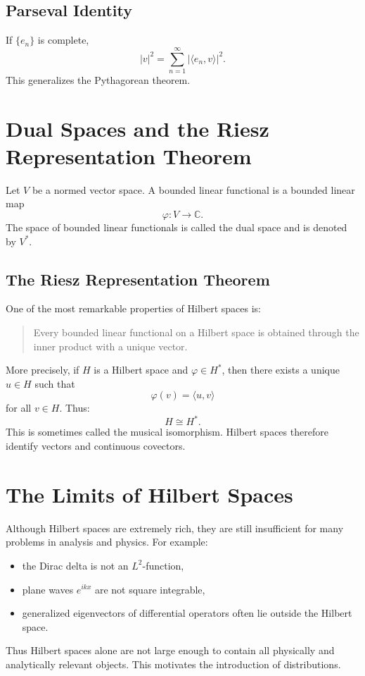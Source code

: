 \documentclass[aps,prl,twocolumn,groupedaddress]{revtex4-2}
\begin{document}
\subsection{Parseval Identity}
If $\{e_n\}$ is complete,
\[
|v|^2 = \sum_{n=1}^\infty |\langle e_n, v\rangle|^2.
\]
This generalizes the Pythagorean theorem.



\section{Dual Spaces and the Riesz Representation Theorem}

Let $V$ be a normed vector space. A bounded linear functional is a bounded linear map 
\[
\varphi : V \rightarrow \mathbb{C}.
\]
The space of bounded linear functionals is called the dual space and is denoted by $V^*$.

\subsection{The Riesz Representation Theorem}
One of the most remarkable properties of Hilbert spaces is:
\begin{quote}
Every bounded linear functional on a Hilbert space is obtained through the inner product with a unique vector.
\end{quote}
More precisely, if $H$ is a Hilbert space and $\varphi \in H^*$, then there exists a unique $u \in H$ such that 
\[
\varphi(v) = \langle u,v\rangle 
\]
for all $v \in H$. Thus:
\[
H \cong H^*.
\]
This is sometimes called the musical isomorphism. Hilbert spaces therefore identify vectors and continuous covectors.



\section{The Limits of Hilbert Spaces}

Although Hilbert spaces are extremely rich, they are still insufficient for many problems in analysis and physics. For example:
\begin{itemize}
\item the Dirac delta is not an $L^2$-function,
\item plane waves $e^{ikx}$ are not square integrable,
\item generalized eigenvectors of differential operators often lie outside the Hilbert space.
\end{itemize}
Thus Hilbert spaces alone are not large enough to contain all physically and analytically relevant objects. This motivates the introduction of distributions.
\end{document}
